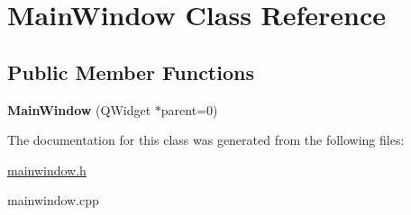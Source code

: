 \hypertarget{class_main_window}{\section{\-Main\-Window \-Class \-Reference}
\label{class_main_window}
}
\subsection*{\-Public \-Member \-Functions}
\begin{DoxyCompactItemize}
\item 
\hypertarget{class_main_window_a8b244be8b7b7db1b08de2a2acb9409db}{{\bfseries \-Main\-Window} (\-Q\-Widget $\ast$parent=0)}\label{class_main_window_a8b244be8b7b7db1b08de2a2acb9409db}

\end{DoxyCompactItemize}


\-The documentation for this class was generated from the following files\-:\begin{DoxyCompactItemize}
\item 
\hyperlink{mainwindow_8h}{mainwindow.\-h}\item 
mainwindow.\-cpp\end{DoxyCompactItemize}
